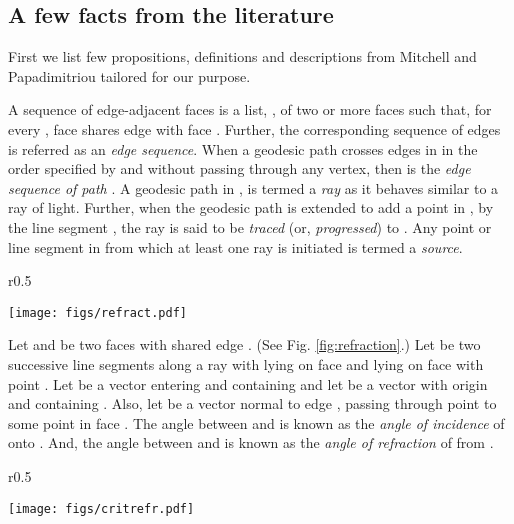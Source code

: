 \documentclass[11pt]{article}
\begin{document}
\subsection*{A few facts from the literature} 

First we list few propositions, definitions and descriptions from Mitchell and Papadimitriou \cite{journals/jacm/MitchellP91} tailored for our purpose.

A sequence of edge-adjacent faces is a list, , of two or more faces such that, for every , face  shares edge  with face .
Further, the corresponding sequence of edges  is referred as an {\it edge sequence}.
When a geodesic path  crosses edges in  in the order specified by  and without passing through any vertex, then  is the {\it edge sequence of path }.
A geodesic path  in , is termed a {\it ray}  as it behaves similar to a  ray of light.
Further, when the geodesic path is extended to add a  point  in , by the  line segment , the ray  is said to be {\it traced} (or, {\it progressed}) to .
Any point or line segment in  from which at least one ray is initiated is termed a {\it source}.

	\begin{wrapfigure}{r}{0.5\textwidth}
	\centering
	\begin{minipage}[t]{\linewidth}
	\centering
	\texttt{[image: figs/refract.pdf]}
	\vspace{-0.15in}
	\caption{\footnotesize Illustrating refraction}
	\label{fig:refraction}
	\end{minipage}
	\end{wrapfigure}

Let  and  be two faces with shared edge .
(See Fig. \ref{fig:refraction}.)
Let  be two successive line segments along a ray  with  lying on face  and  lying on face  with point .
Let  be a vector entering  and containing  and let  be a vector with origin  and containing .
Also, let  be a vector normal to edge , passing through point  to some point in face . 
The angle  between  and  is known as the {\it angle of incidence} of  onto .
And, the angle  between  and  is known as the {\it angle of refraction} of  from .

	\begin{wrapfigure}{r}{0.5\textwidth}
	\centering
	\begin{minipage}[t]{\linewidth}
	\centering
	\texttt{[image: figs/critrefr.pdf]}
	\caption{\footnotesize Illustrating critical reflection}
	\label{fig:critrefl}
	\end{minipage}
	\end{wrapfigure}
\end{document}
